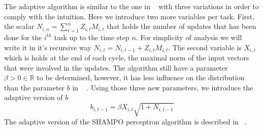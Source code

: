 {The adaptive algorithm is similar to the one in ~ with three variations in order to 
comply with the intuition. Here we introduce two more variables per task. First, the scalar 
$N_{i,n} = \sum_{t=1}^n{Z_{i,t}M_{i,t}}$ that holds the number of updates that has been done for the 
$i^{th}$ task  up to the time step $n$.
For simplicity of analysis we will write it in it's recursive way $N_{i,t}=N_{i,t-1}+Z_{i,t}M_{i,t}$.
The second variable is $X_{i,t}$ which is holds at the end of each cycle,  
the maximal norm of the input vectors that were involved in the updates.  
The algorithm still have a parameter $\beta>0 \in\mathbb{R}$ to be 
determined, however, it has less influence on the distribution than the parameter $b$ in ~ .
Using those three new parameters, we introduce the adaptive version of $b$
\[
b_{i,t-1}=\beta X_{i,t} \sqrt{1+N_{i,t-1}}
\]
 The adaptive version of the  SHAMPO perceptron algorithm is  described in ~. 

}
